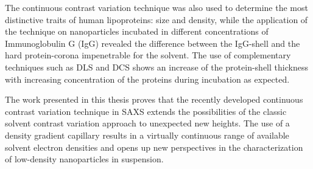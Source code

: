The continuous contrast variation technique was also used to determine the most distinctive traits of human lipoproteins: size and density, while the application of the technique on nanoparticles incubated in different concentrations of Immunoglobulin G (IgG) revealed the difference between the IgG-shell and the hard protein-corona impenetrable for the solvent. The use of complementary techniques such as DLS and DCS shows an increase of the protein-shell thickness with increasing concentration of the proteins during incubation as expected.

The work presented in this thesis proves that the recently developed continuous contrast variation technique in SAXS extends the possibilities of the classic solvent contrast variation approach to unexpected new heights. The use of a density gradient capillary results in a virtually continuous range of available solvent electron densities and opens up new perspectives in the characterization of low-density nanoparticles in suspension.
